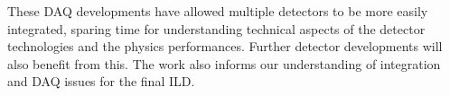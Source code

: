 These DAQ developments have allowed multiple detectors to be more easily integrated, sparing time for understanding technical aspects of the detector technologies and the physics performances.  Further detector developments will also benefit from this. The work also informs our understanding of integration and DAQ issues for the final ILD.

\vspace{2cm}
